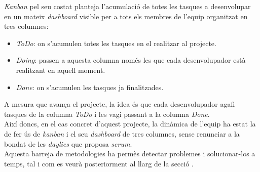 \newline \textit{Kanban} pel seu costat planteja l'acumulació de totes les tasques a desenvolupar en un mateix \textit{dashboard} visible per a tots els membres de l'equip organitzat en tres columnes:
\begin{itemize}
    \item \textit{ToDo}: on s'acumulen totes les tasques en el realitzar al projecte.
    \item \textit{Doing}: passen a aquesta columna només les que cada desenvolupador està realitzant en aquell moment.
    \item \textit{Done}: on s'acumulen les tasques ja finalitzades.
\end{itemize}
A mesura que avança el projecte, la idea és que cada desenvolupador agafi tasques de la columna \textit{ToDo} i les vagi passant a la columna \textit{Done}.\\
\newline Així doncs, en el cas concret d'aquest projecte, la dinàmica de l'equip ha estat la de fer ús de \textit{kanban} i el seu \textit{dashboard} de tres columnes, sense renunciar a la bondat de les \textit{daylies} que proposa \textit{scrum}.\\
\newline Aquesta barreja de metodologies ha permès detectar problemes i solucionar-los a temps, tal i com es veurà posteriorment al llarg de la secció .
